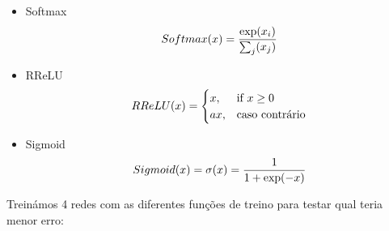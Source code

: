 \documentclass[10pt]{article}
\begin{document}
\begin{itemize}
  \item Softmax
  \begin{equation}
  \vspace{1cm}
  Softmax(x) = \frac{\exp(x_i)}{\sum_j(x_j)}
  \end{equation}
  
  \item RReLU
  \begin{equation}
    \vspace{1cm}
    RReLU(x) =
      \begin{cases}
            x, & \mbox{if } x \geq \mbox{0} \\
            ax, & \mbox{caso contrário}
      \end{cases}
  \end{equation}
  \item Sigmoid
  \begin{equation}
    \vspace{1cm}
    Sigmoid(x) =  \sigma(x) = \frac{1}{1+\exp(-x)}
  \end{equation}
\end{itemize}
\vspace{1cm}
Treinámos 4 redes com as diferentes funções de treino para testar qual teria menor erro:  
\vspace{1cm}
\end{document}
